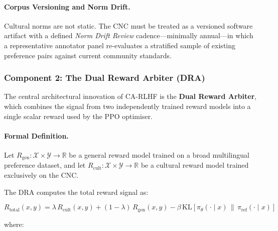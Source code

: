 \paragraph{Corpus Versioning and Norm Drift.}
Cultural norms are not static.
The CNC must be treated as a versioned software artifact with a
defined \emph{Norm Drift Review} cadence---minimally annual---in
which a representative annotator panel re-evaluates a stratified
sample of existing preference pairs against current community
standards.

\subsubsection{Component 2: The Dual Reward Arbiter (DRA)}
\label{subsubsec:dra}

The central architectural innovation of CA-RLHF is the
\textbf{Dual Reward Arbiter}, which combines the signal from two
independently trained reward models into a single scalar reward
used by the PPO optimiser.

\paragraph{Formal Definition.}
Let $R_{\mathrm{gen}} : \mathcal{X} \times \mathcal{Y} \to
\mathbb{R}$ be a general reward model trained on a broad
multilingual preference dataset, and let $R_{\mathrm{cult}} :
\mathcal{X} \times \mathcal{Y} \to \mathbb{R}$ be a cultural
reward model trained exclusively on the CNC.

The DRA computes the total reward signal as:

\begin{equation}
  \label{eq:dra-reward}
  R_{\mathrm{total}}(x, y)
    = \lambda\,R_{\mathrm{cult}}(x, y)
    + (1-\lambda)\,R_{\mathrm{gen}}(x, y)
    - \beta\,\mathrm{KL}\!\left[\pi_\theta(\cdot \mid x)
      \,\|\, \pi_{\mathrm{ref}}(\cdot \mid x)\right]
\end{equation}

where:

